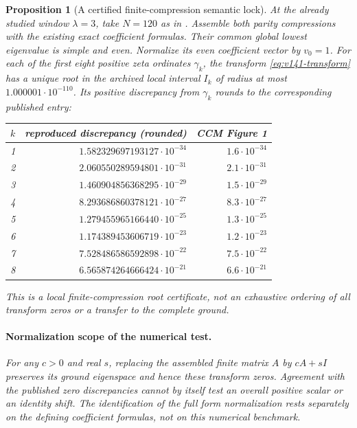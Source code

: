 \documentclass[11pt]{article}
\newtheorem{proposition}[theorem]{Proposition}
\theoremstyle{remark}
\begin{document}
\begin{proposition}[A certified finite-compression semantic lock]
\label{prop:v141-ccm-lock}
At the already studied window $\lambda=3$, take $N=120$ as in
\cite[Section 6, Figure 1]{ConnesConsaniMoscovici2025}. Assemble
both parity compressions with the existing exact coefficient formulas.
Their common global lowest eigenvalue is simple and even. Normalize
its even coefficient vector by $v_0=1$. For each of the first eight
positive zeta ordinates $\gamma_k$, the transform
\eqref{eq:v141-transform} has a unique root in the archived local
interval $I_k$ of radius at most $1.000001\cdot10^{-110}$.
Its positive discrepancy from $\gamma_k$ rounds to the corresponding
published entry:
\begin{center}
\begin{tabular}{rrr}
\toprule
$k$ & reproduced discrepancy (rounded) & CCM Figure 1\\
\midrule
1 & $1.582329697193127\cdot10^{-34}$ & $1.6\cdot10^{-34}$\\
2 & $2.060550289594801\cdot10^{-31}$ & $2.1\cdot10^{-31}$\\
3 & $1.460904856368295\cdot10^{-29}$ & $1.5\cdot10^{-29}$\\
4 & $8.293686860378121\cdot10^{-27}$ & $8.3\cdot10^{-27}$\\
5 & $1.279455965166440\cdot10^{-25}$ & $1.3\cdot10^{-25}$\\
6 & $1.174389453606719\cdot10^{-23}$ & $1.2\cdot10^{-23}$\\
7 & $7.528486586592898\cdot10^{-22}$ & $7.5\cdot10^{-22}$\\
8 & $6.565874264666424\cdot10^{-21}$ & $6.6\cdot10^{-21}$\\
\bottomrule
\end{tabular}
\end{center}
This is a local finite-compression root certificate, not an exhaustive
ordering of all transform zeros or a transfer to the complete ground.

\paragraph{Normalization scope of the numerical test.}
For any $c>0$ and real $s$, replacing the assembled finite matrix
$A$ by $cA+sI$ preserves its ground eigenspace and hence these
transform zeros. Agreement with the published zero discrepancies
cannot by itself test an overall positive scalar or an identity shift.
The identification of the full form normalization rests separately on
the defining coefficient formulas, not on this numerical benchmark.
\end{proposition}
\end{document}
